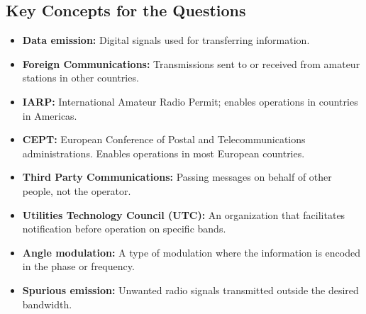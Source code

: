  


\subsection*{Key Concepts for the Questions}
\begin{itemize}
    \item \textbf{Data emission:}  Digital signals used for transferring information.
    \item \textbf{Foreign Communications:} Transmissions sent to or received from amateur stations in other countries.
    \item \textbf{IARP:} International Amateur Radio Permit; enables operations in countries in Americas.
    \item \textbf{CEPT:} European Conference of Postal and Telecommunications administrations. Enables operations in most European countries.
    \item \textbf{Third Party Communications:} Passing messages on behalf of other people, not the operator.
    \item \textbf{Utilities Technology Council (UTC):} An organization that facilitates notification before operation on specific bands.
    \item \textbf{Angle modulation:} A type of modulation where the information is encoded in the phase or frequency.
    \item \textbf{Spurious emission:} Unwanted radio signals transmitted outside the desired bandwidth.
\end{itemize}


